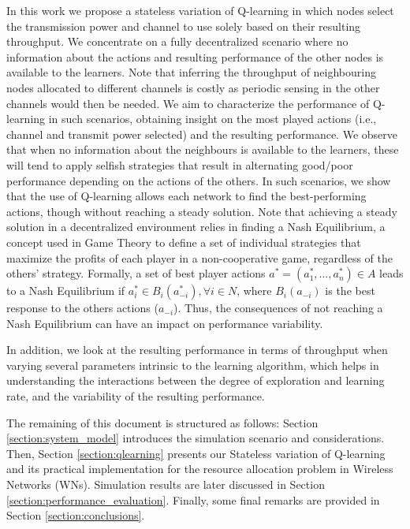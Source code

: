 \documentclass{article}
\begin{document}
	In this work we propose a stateless variation of Q-learning in which nodes select the transmission power and channel to use solely based on their resulting throughput. We concentrate on a fully decentralized scenario where no information about the actions and resulting performance of the other nodes is available to the learners. Note that inferring the throughput of neighbouring nodes allocated to different channels is costly as periodic sensing in the other channels would then be needed. We aim to characterize the performance of Q-learning in such scenarios, obtaining insight on the most played actions (i.e., channel and transmit power selected) and the resulting performance. We observe that when no information about the neighbours is available to the learners, these will tend to apply selfish strategies that result in alternating good/poor performance depending on the actions of the others. In such scenarios, we show that the use of Q-learning allows each network to find the best-performing actions, though without reaching a steady solution. Note that achieving a steady solution in a decentralized environment relies in finding a Nash Equilibrium, a concept used in Game Theory to define a set of individual strategies that maximize the profits of each player in a non-cooperative game, regardless of the others' strategy. Formally, a set of best player actions $a^* = (a_1^*, ..., a_n^*) \in A$ leads to a Nash Equilibrium if $a_i^* \in B_i(a_{-i}^*), \forall i \in N$, where $B_i(a_{-i})$ is the best response to the others actions ($a_{-i}$). Thus, the consequences of not reaching a Nash Equilibrium can have an impact on performance variability.
	
	In addition, we look at the resulting performance in terms of throughput when varying several parameters intrinsic to the learning algorithm, which helps in understanding the interactions between the degree of exploration and learning rate, and the variability of the resulting performance. 
	
	The remaining of this document is structured as follows: Section \ref{section:system_model} introduces the simulation scenario and considerations. Then, Section \ref{section:qlearning} presents our Stateless variation of Q-learning and its practical implementation for the resource allocation problem in Wireless Networks (WNs). Simulation results are later discussed in Section \ref{section:performance_evaluation}. Finally, some final remarks are provided in Section \ref{section:conclusions}. 
	
\end{document}
